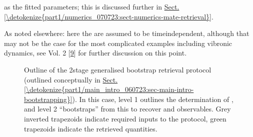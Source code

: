 \documentclass[letterpaper,table,10pt,english]{jupyterBook}
\begin{document}
{\hyperref[\detokenize{backmatter/glossary:term-radial-matrix-elements}]{}} as the fitted parameters; this is discussed further in \hyperref[\detokenize{part1/numerics_070723:sect-numerics-mate-retrieval}]{Sect.\@ \ref{\detokenize{part1/numerics_070723:sect-numerics-mate-retrieval}}}. %
\begin{footnote}[1]\sphinxAtStartFootnote
As noted elsewhere: here the {\hyperref[\detokenize{backmatter/glossary:term-radial-matrix-elements}]{}} are assumed to be time\sphinxhyphen{}independent, although that may not be the case for the most complicated examples including vibronic dynamics, see  Vol. 2 {[}\hyperlink{cite.backmatter/bibliography:id678}{9}{]} for further discussion on this point.
%
\end{footnote}

\begin{figure}[htbp]
\centering
\capstart

\noindent{}
\caption{Outline of the 2\sphinxhyphen{}stage generalised bootstrap {\hyperref[\detokenize{backmatter/glossary:term-radial-matrix-elements}]{}} retrieval protocol (outlined conceptually in \hyperref[\detokenize{part1/main_intro_060723:sec-main-intro-bootstrapping}]{Sect.\@ \ref{\detokenize{part1/main_intro_060723:sec-main-intro-bootstrapping}}}). In this case, level 1 outlines the determination of {\hyperref[\detokenize{backmatter/glossary:term-ADMs}]{}}, and level 2 “bootstraps” from this to recover {\hyperref[\detokenize{backmatter/glossary:term-radial-matrix-elements}]{}} and {\hyperref[\detokenize{backmatter/glossary:term-MF}]{}} observables. Grey inverted trapezoids indicate required inputs to the protocol, green trapezoids indicate the retrieved quantities.}\label{\detokenize{part1/numerics_070723:fig-bootstrap-fitting-diag}}\end{figure}
\end{document}
